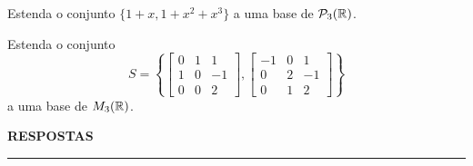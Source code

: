 \documentclass[12pt]{exam}
\begin{document}
    \begin{exercicio}
        Estenda o conjunto $\{1 + x, 1 + x^2 + x^3\}$ a uma base de $\mathcal{P}_3(\mathbb{R})$.
    \end{exercicio}

    \begin{exercicio}
        Estenda o conjunto
        \[
        S = \left\{
            \begin{bmatrix}
                0 & 1 & 1\\
                1 & 0 & -1\\
                0 & 0 & 2
            \end{bmatrix},
            \begin{bmatrix}
                -1 & 0 & 1\\
                0 & 2 & -1\\
                0 & 1 & 2
            \end{bmatrix}
        \right\}
        \]
        a uma base de $M_3(\mathbb{R})$.
    \end{exercicio}


    \newpage
    

    \begin{center}
        {\large\bf RESPOSTAS}
    \end{center}

    \hrule
    
    
\end{document}
